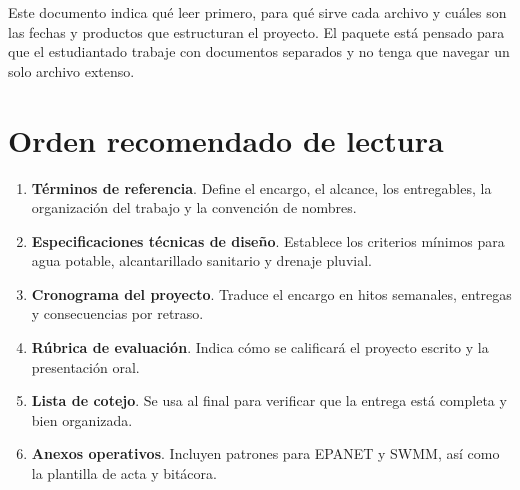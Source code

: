 \documentclass[11pt]{article}
\begin{document}

\begin{infobox}
Este documento indica qu\'e leer primero, para qu\'e sirve cada archivo y cu\'ales son las fechas y productos que estructuran el proyecto. El paquete est\'a pensado para que el estudiantado trabaje con documentos separados y no tenga que navegar un solo archivo extenso.
\end{infobox}

\section{Orden recomendado de lectura}
\begin{enumerate}
\item \textbf{T\'erminos de referencia}. Define el encargo, el alcance, los entregables, la organizaci\'on del trabajo y la convenci\'on de nombres.
\item \textbf{Especificaciones t\'ecnicas de dise\~no}. Establece los criterios m\'inimos para agua potable, alcantarillado sanitario y drenaje pluvial.
\item \textbf{Cronograma del proyecto}. Traduce el encargo en hitos semanales, entregas y consecuencias por retraso.
\item \textbf{R\'ubrica de evaluaci\'on}. Indica c\'omo se calificar\'a el proyecto escrito y la presentaci\'on oral.
\item \textbf{Lista de cotejo}. Se usa al final para verificar que la entrega est\'a completa y bien organizada.
\item \textbf{Anexos operativos}. Incluyen patrones para EPANET y SWMM, as\'i como la plantilla de acta y bit\'acora.
\end{enumerate}
\end{document}
